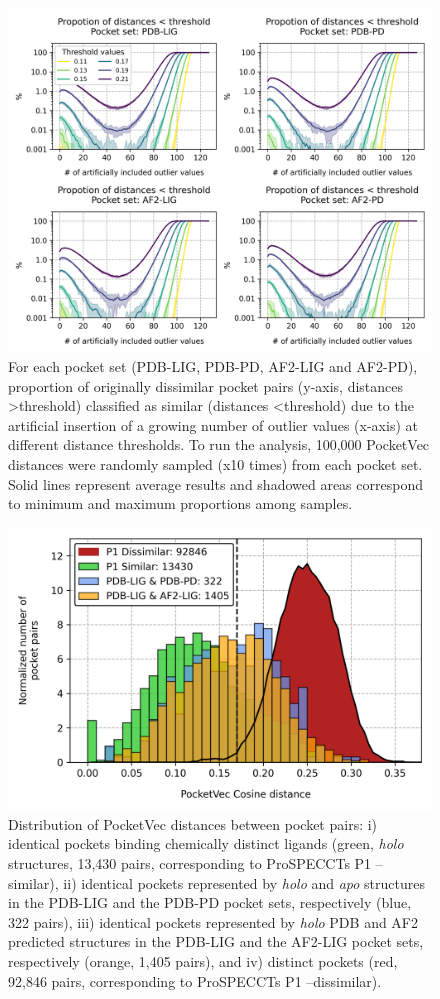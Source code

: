 \begin{figure}[htbp]
  \centering
  \includegraphics[width=0.9\linewidth]{figures/PocketVec/Supplementary/FigS23.png}
  \caption{
  For each pocket set (PDB-LIG, PDB-PD, AF2-LIG and AF2-PD), proportion of originally dissimilar pocket pairs (y-axis, distances >threshold) classified as similar (distances <threshold) due to the artificial insertion of a growing number of outlier values (x-axis) at different distance thresholds. To run the analysis, 100,000 PocketVec distances were randomly sampled (x10 times) from each pocket set. Solid lines represent average results and shadowed areas correspond to minimum and maximum proportions among samples.
  }
  \label{PocketVec_FigS23}
\end{figure}


\begin{figure}[htbp]
  \centering
  \includegraphics[width=0.6\linewidth]{figures/PocketVec/Supplementary/FigS24.png}
  \caption{
  Distribution of PocketVec distances between pocket pairs: i) identical pockets binding chemically distinct ligands (green, \textit{holo} structures, 13,430 pairs, corresponding to ProSPECCTs P1 --similar), ii) identical pockets represented by \textit{holo} and \textit{apo} structures in the PDB-LIG and the PDB-PD pocket sets, respectively (blue, 322 pairs), iii) identical pockets represented by \textit{holo} PDB and AF2 predicted structures in the PDB-LIG and the AF2-LIG pocket sets, respectively (orange, 1,405 pairs), and iv) distinct pockets (red, 92,846 pairs, corresponding to ProSPECCTs P1 --dissimilar). 
  }
  \label{PocketVec_FigS24}
\end{figure}


